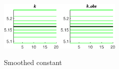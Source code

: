  
\begin{figure}[H]
\centering 
\includegraphics[width=0.53\textwidth]{RBC_kz/Output/RBC_kz_Constant_k_obs}
\label{Fig:Constant:k_obs}
\caption{Smoothed constant}
\end{figure}
 
